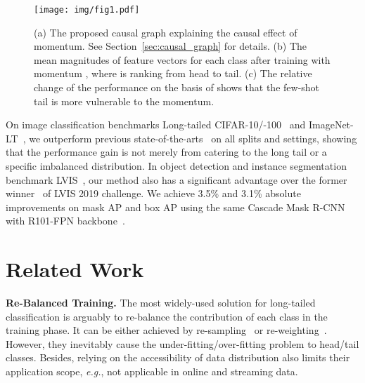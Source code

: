 \documentclass{article}
\newcommand{\eg}{\textit{e.g.}}
\begin{document}
\begin{figure}[t]
   \texttt{[image: img/fig1.pdf]}
   \caption{(a) The proposed causal graph explaining the causal effect of momentum. See Section~\ref{sec:causal_graph} for details. (b) The mean magnitudes of feature vectors for each class  after training with momentum , where  is ranking from head to tail.  (c) The relative change of the performance on the basis of  shows that the few-shot tail is more vulnerable to the momentum.}
   \label{fig:1} \vspace{-5mm}
\end{figure}

On image classification benchmarks Long-tailed CIFAR-10/-100~\cite{cao2019learning, zhou2019bbn} and ImageNet-LT~\cite{liu2019large}, we outperform previous state-of-the-arts~\cite{zhou2019bbn, kang2019decoupling} on all splits and settings, showing that the performance gain is not merely from catering to the long tail or a specific imbalanced distribution. In object detection and instance segmentation benchmark LVIS~\cite{gupta2019lvis}, our method also has a significant advantage over the former winner~\cite{tan2020equalization} of LVIS 2019 challenge. We achieve 3.5\% and 3.1\% absolute improvements on mask AP and box AP using the same Cascade Mask R-CNN with R101-FPN backbone~\cite{cai2018cascade}.




















\section{Related Work}

\textbf{Re-Balanced Training.} The most widely-used solution for long-tailed classification is arguably to re-balance the contribution of each class in the training phase. It can be either achieved by re-sampling~\cite{chawla2002smote, drummond2003c4, shen2016relay, mahajan2018exploring, hu2020learning} or re-weighting~\cite{cui2019class, khan2017cost, cao2019learning, tan2020equalization}. However, they inevitably cause the under-fitting/over-fitting problem to head/tail classes. Besides, relying on the accessibility of data distribution also limits their application scope, \eg, not applicable in online and streaming data.
\end{document}
